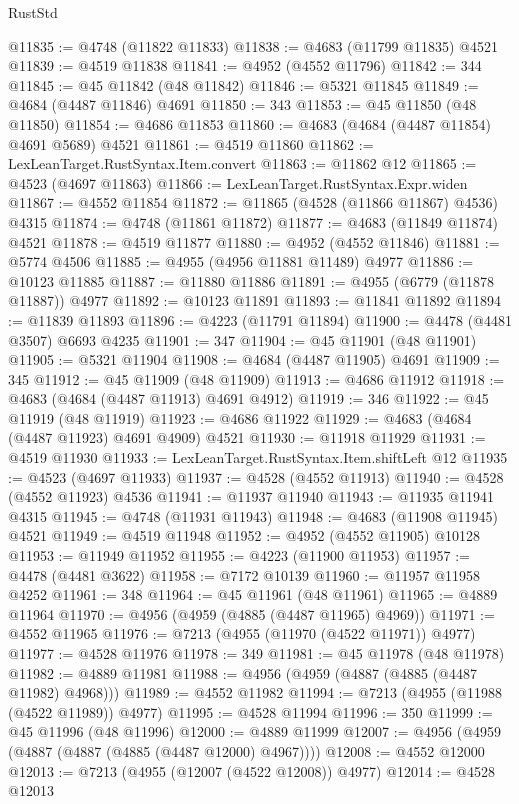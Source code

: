 \begin{lexlean}{RustStd}
\begin{coremodule}
@11835 := @4748 (@11822 @11833)
@11838 := @4683 (@11799 @11835) @4521
@11839 := @4519 @11838
@11841 := @4952 (@4552 @11796)
@11842 := 344
@11845 := @45 @11842 (@48 @11842)
@11846 := @5321 @11845
@11849 := @4684 (@4487 @11846) @4691
@11850 := 343
@11853 := @45 @11850 (@48 @11850)
@11854 := @4686 @11853
@11860 := @4683 (@4684 (@4487 @11854) @4691 @5689) @4521
@11861 := @4519 @11860
@11862 := LexLeanTarget.RustSyntax.Item.convert
@11863 := @11862 @12
@11865 := @4523 (@4697 @11863)
@11866 := LexLeanTarget.RustSyntax.Expr.widen
@11867 := @4552 @11854
@11872 := @11865 (@4528 (@11866 @11867) @4536) @4315
@11874 := @4748 (@11861 @11872)
@11877 := @4683 (@11849 @11874) @4521
@11878 := @4519 @11877
@11880 := @4952 (@4552 @11846)
@11881 := @5774 @4506
@11885 := @4955 (@4956 @11881 @11489) @4977
@11886 := @10123 @11885
@11887 := @11880 @11886
@11891 := @4955 (@6779 (@11878 @11887)) @4977
@11892 := @10123 @11891
@11893 := @11841 @11892
@11894 := @11839 @11893
@11896 := @4223 (@11791 @11894)
@11900 := @4478 (@4481 @3507) @6693 @4235
@11901 := 347
@11904 := @45 @11901 (@48 @11901)
@11905 := @5321 @11904
@11908 := @4684 (@4487 @11905) @4691
@11909 := 345
@11912 := @45 @11909 (@48 @11909)
@11913 := @4686 @11912
@11918 := @4683 (@4684 (@4487 @11913) @4691 @4912)
@11919 := 346
@11922 := @45 @11919 (@48 @11919)
@11923 := @4686 @11922
@11929 := @4683 (@4684 (@4487 @11923) @4691 @4909) @4521
@11930 := @11918 @11929
@11931 := @4519 @11930
@11933 := LexLeanTarget.RustSyntax.Item.shiftLeft @12
@11935 := @4523 (@4697 @11933)
@11937 := @4528 (@4552 @11913)
@11940 := @4528 (@4552 @11923) @4536
@11941 := @11937 @11940
@11943 := @11935 @11941 @4315
@11945 := @4748 (@11931 @11943)
@11948 := @4683 (@11908 @11945) @4521
@11949 := @4519 @11948
@11952 := @4952 (@4552 @11905) @10128
@11953 := @11949 @11952
@11955 := @4223 (@11900 @11953)
@11957 := @4478 (@4481 @3622)
@11958 := @7172 @10139
@11960 := @11957 @11958 @4252
@11961 := 348
@11964 := @45 @11961 (@48 @11961)
@11965 := @4889 @11964
@11970 := @4956 (@4959 (@4885 (@4487 @11965) @4969))
@11971 := @4552 @11965
@11976 := @7213 (@4955 (@11970 (@4522 @11971)) @4977)
@11977 := @4528 @11976
@11978 := 349
@11981 := @45 @11978 (@48 @11978)
@11982 := @4889 @11981
@11988 := @4956 (@4959 (@4887 (@4885 (@4487 @11982) @4968)))
@11989 := @4552 @11982
@11994 := @7213 (@4955 (@11988 (@4522 @11989)) @4977)
@11995 := @4528 @11994
@11996 := 350
@11999 := @45 @11996 (@48 @11996)
@12000 := @4889 @11999
@12007 := @4956 (@4959 (@4887 (@4887 (@4885 (@4487 @12000) @4967))))
@12008 := @4552 @12000
@12013 := @7213 (@4955 (@12007 (@4522 @12008)) @4977)
@12014 := @4528 @12013

\end{coremodule}
\end{lexlean}
